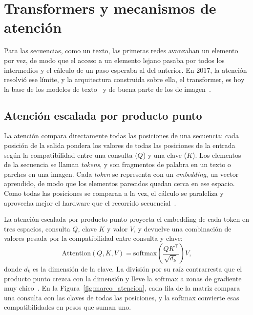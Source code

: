 \section{Transformers y mecanismos de atención}
\label{sec:marco_atencion}

Para las secuencias, como un texto, las primeras redes avanzaban un elemento por vez, de modo que el acceso a un
elemento lejano pasaba por todos los intermedios y el cálculo de un paso esperaba al del anterior. En 2017, la
atención resolvió ese límite, y la arquitectura construida sobre ella, el transformer, es hoy la base de los
modelos de texto~\cite{vaswani2017attention} y de buena parte de los de imagen~\cite{dosovitskiy2021image}.

\subsection{Atención escalada por producto punto}
\label{sec:marco_atencion_producto}

La atención compara directamente todas las posiciones de una secuencia: cada posición de la salida pondera
los valores de todas las posiciones de la entrada según la compatibilidad entre una consulta ($Q$) y una clave
($K$). Los elementos de la secuencia se llaman \emph{tokens}, y son fragmentos de palabra en un texto o parches
en una imagen. Cada \emph{token} se representa con un \emph{embedding}, un vector aprendido, de modo que los
elementos parecidos quedan cerca en ese espacio. Como todas las posiciones se comparan a la vez, el cálculo se
paraleliza y aprovecha mejor el hardware que el recorrido secuencial~\cite{vaswani2017attention}.

La atención escalada por producto punto proyecta el embedding de cada token en tres espacios,
consulta $Q$, clave $K$ y valor $V$, y devuelve una combinación de valores pesada por la compatibilidad entre
consulta y clave:
\begin{equation}
    \mathrm{Attention}(Q, K, V) = \mathrm{softmax}\!\left(\frac{QK^{\top}}{\sqrt{d_k}}\right) V,
    \label{eq:marco_atencion}
\end{equation}
donde $d_k$ es la dimensión de la clave. La división por su raíz contrarresta que el producto punto
crezca con la dimensión y lleve la softmax a zonas de gradiente muy chico~\cite{vaswani2017attention}. En la Figura~\ref{fig:marco_atencion}, cada
fila de la matriz compara una consulta con las claves de todas las posiciones, y la softmax convierte esas
compatibilidades en pesos que suman uno.

